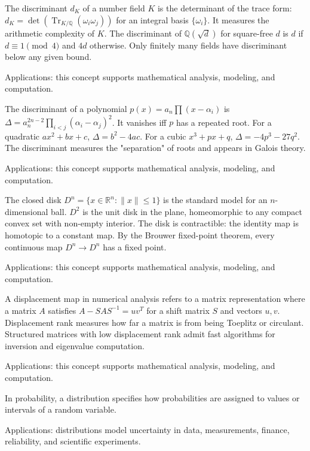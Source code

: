 The discriminant $d_K$ of a number field $K$ is the determinant of the trace form: $d_K = \det(\operatorname{Tr}_{K/\mathbb{Q}}(\omega_i \omega_j))$ for an integral basis $\{\omega_i\}$. It measures the arithmetic complexity of $K$. The discriminant of $\mathbb{Q}(\sqrt{d})$ for square-free $d$ is $d$ if $d \equiv 1 \pmod 4$ and $4d$ otherwise. Only finitely many fields have discriminant below any given bound. \par\noindent Applications: this concept supports mathematical analysis, modeling, and computation.

The discriminant of a polynomial $p(x) = a_n \prod(x - \alpha_i)$ is $\Delta = a_n^{2n-2} \prod_{i < j}(\alpha_i - \alpha_j)^2$. It vanishes iff $p$ has a repeated root. For a quadratic $ax^2 + bx + c$, $\Delta = b^2 - 4ac$. For a cubic $x^3 + px + q$, $\Delta = -4p^3 - 27q^2$. The discriminant measures the "separation" of roots and appears in Galois theory. \par\noindent Applications: this concept supports mathematical analysis, modeling, and computation.

The closed disk $D^n = \{x \in \mathbb{R}^n : \|x\| \leq 1\}$ is the standard model for an $n$-dimensional ball. $D^2$ is the unit disk in the plane, homeomorphic to any compact convex set with non-empty interior. The disk is contractible: the identity map is homotopic to a constant map. By the Brouwer fixed-point theorem, every continuous map $D^n \to D^n$ has a fixed point. \par\noindent Applications: this concept supports mathematical analysis, modeling, and computation.

A displacement map in numerical analysis refers to a matrix representation where a matrix $A$ satisfies $A - S A S^{-1} = uv^T$ for a shift matrix $S$ and vectors $u, v$. Displacement rank measures how far a matrix is from being Toeplitz or circulant. Structured matrices with low displacement rank admit fast algorithms for inversion and eigenvalue computation. \par\noindent Applications: this concept supports mathematical analysis, modeling, and computation.

In probability, a distribution specifies how probabilities are assigned to values or intervals of a random variable. \par\noindent Applications: distributions model uncertainty in data, measurements, finance, reliability, and scientific experiments.

